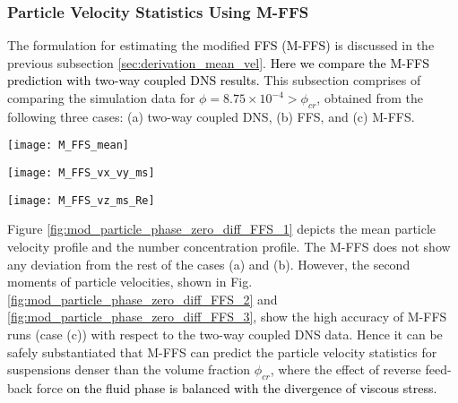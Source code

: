 \documentclass[notitlepage]{revtex4-1}
\begin{document}
\subsubsection{\textbf{Particle Velocity Statistics Using M-FFS}}
The formulation for estimating the modified \textcolor{black}{FFS (M-FFS)} is discussed in the previous subsection \ref{sec:derivation_mean_vel}. \textcolor{black}{Here we compare the M-FFS prediction with two-way coupled DNS results.}
This subsection comprises of comparing the simulation data for $\phi=8.75\times10^{-4}>\phi_{cr}$, obtained from the following three cases:
(a) two-way coupled DNS, (b) FFS,  and (c) M-FFS. 
\begin{figure*}[!]
\texttt{[image: M\_FFS\_mean]}
			\caption{Comparison of (a) mean velocity, (b)  number concentration of particle phase obtained from two-way DNS,  FFS and M-FFS model for $\phi=8.75\times10^{-4}>\phi_{cr}$} 
			\label{fig:mod_particle_phase_zero_diff_FFS_1}
\end{figure*}
\begin{figure*}[!]
			\texttt{[image: M\_FFS\_vx\_vy\_ms]}
			\caption{Comparison of (a) streamwise mean square velocity, (b)  cross-stream mean square velocity of particle phase obtained from two-way DNS,  FFS and M-FFS model for $\phi=8.75\times10^{-4}>\phi_{cr}$}
			\label{fig:mod_particle_phase_zero_diff_FFS_2}
\end{figure*} 
\begin{figure*}[!]
\texttt{[image: M\_FFS\_vz\_ms\_Re]}
			\caption{Comparison of (a) spanwise mean square velocity, (b) streamwise and cross-stream velocity cross-correlation of the particle phase obtained from two-way DNS,  FFS and M-FFS model for $\phi=8.75\times10^{-4}>\phi_{cr}$} 
			\label{fig:mod_particle_phase_zero_diff_FFS_3}
\end{figure*}
Figure \ref{fig:mod_particle_phase_zero_diff_FFS_1} depicts the mean particle velocity profile and the number concentration profile. The M-FFS  does not show any deviation from the rest of the cases (a) and (b). However, the second moments of particle velocities, shown in Fig. \ref{fig:mod_particle_phase_zero_diff_FFS_2} and \ref{fig:mod_particle_phase_zero_diff_FFS_3}, show the high accuracy of M-FFS runs (case (c)) with respect to the two-way coupled DNS data. Hence it can be safely substantiated that M-FFS  can predict the particle velocity statistics for suspensions denser than the volume fraction $\phi_{cr}$, where the effect of reverse feed-back force \textcolor{black}{on the fluid phase is balanced with the divergence of viscous stress.}  
\end{document}
